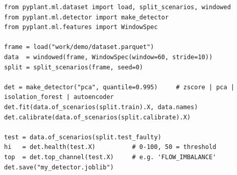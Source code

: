 \begin{lstlisting}
from pyplant.ml.dataset import load, split_scenarios, windowed
from pyplant.ml.detector import make_detector
from pyplant.ml.features import WindowSpec

frame = load("work/demo/dataset.parquet")
data  = windowed(frame, WindowSpec(window=60, stride=10))
split = split_scenarios(frame, seed=0)

det = make_detector("pca", quantile=0.995)     # zscore | pca | isolation_forest | autoencoder
det.fit(data.of_scenarios(split.train).X, data.names)
det.calibrate(data.of_scenarios(split.calibrate).X)

test = data.of_scenarios(split.test_faulty)
hi   = det.health(test.X)          # 0-100, 50 = threshold
top  = det.top_channel(test.X)     # e.g. 'FLOW_IMBALANCE'
det.save("my_detector.joblib")
\end{lstlisting}
